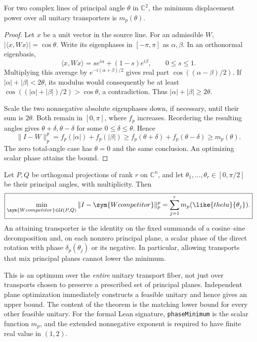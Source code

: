 \begin{proposition}
\label{prop:schatten-planar-minimum}
For two complex lines of principal angle $\theta$ in $\mathbb C^2$,
the minimum displacement power over all unitary transporters is
$m_p(\theta)$.
\end{proposition}

\begin{proof}
Let $x$ be a unit vector in the source line. For an admissible $W$,
$|\langle x,Wx\rangle|=\cos\theta$. Write its eigenphases in
$[-\pi,\pi]$ as $\alpha,\beta$. In an orthonormal eigenbasis,
\[
 \langle x,Wx\rangle=s e^{i\alpha}+(1-s)e^{i\beta},\qquad 0\leq s\leq1.
\]
Multiplying this average by $e^{-i(\alpha+\beta)/2}$ gives real part
$\cos((\alpha-\beta)/2)$. If $|\alpha|+|\beta|<2\theta$, its modulus
would consequently be at least
$\cos((|\alpha|+|\beta|)/2)>\cos\theta$, a contradiction. Thus
$|\alpha|+|\beta|\geq2\theta$.

Scale the two nonnegative absolute eigenphases down, if necessary, until
their sum is $2\theta$. Both remain in $[0,\pi]$, where $f_p$ increases.
Reordering the resulting angles gives $\theta+\delta,\theta-\delta$
for some $0\leq\delta\leq\theta$. Hence
\[
 \|I-W\|_p^p=f_p(|\alpha|)+f_p(|\beta|)
       \geq f_p(\theta+\delta)+f_p(\theta-\delta)\geq m_p(\theta).
\]
The zero total-angle case has $\theta=0$ and the same conclusion.
An optimizing scalar phase attains the bound.
\end{proof}

\begin{theorem}
\label{thm:schatten-independent-planes}
Let $P,Q$ be orthogonal projections of rank $r$ on $\mathbb C^n$, and let
$\theta_1,\ldots,\theta_r\in[0,\pi/2]$ be their principal angles, with
multiplicity. Then
\begin{equation}
 \boxed{\min_{\sym{Wcompetitor}\in\mathcal U(P,Q)}\|I-\sym{Wcompetitor}\|_p^p
                 =\sum_{j=1}^r m_p(\like{theta}{\theta_j}).}
 \label{eq:schatten-unrestricted-minimum}
\end{equation}
An attaining transporter is the identity on the fixed summands of a
cosine--sine decomposition and, on each nonzero principal plane, a scalar
phase of the direct rotation with phase $\delta_p(\theta_j)$ or its
negative. In particular, allowing transports that mix principal planes
cannot lower the minimum.
\end{theorem}

This is an optimum over the \emph{entire} unitary transport fiber, not just
over transports chosen to preserve a prescribed set of principal planes.
Independent plane optimization immediately constructs a feasible unitary
and hence gives an upper bound. The content of the theorem is the matching
lower bound for every other feasible unitary. For the formal Lean signature,
\texttt{phaseMinimum} is the scalar function $m_p$, and the extended
nonnegative exponent is required to have finite real value in $(1,2)$.


